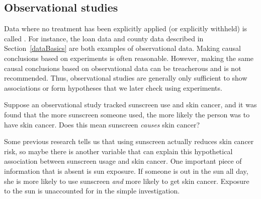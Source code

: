

\D{\newpage}

\subsection{Observational studies}

Data where no treatment has been explicitly applied
(or explicitly withheld) is called .
For instance, the loan data and county data described in
Section~\ref{dataBasics}
are both examples of observational data.
Making causal conclusions based on experiments is often reasonable.
However, making the same causal conclusions based on observational
data can be treacherous and is not recommended.
Thus, observational studies are generally only sufficient
to show associations or form hypotheses that we later check
using experiments.

\begin{exercisewrap}
\begin{nexercise}\label{sunscreenLurkingExample}%
Suppose an observational study tracked sunscreen use and skin cancer, and it was found that the more sunscreen someone used, the more likely the person was to have skin cancer. Does this mean sunscreen \emph{causes} skin cancer?\footnotemark
\end{nexercise}
\end{exercisewrap}

Some previous research tells us that using sunscreen actually reduces skin cancer risk, so maybe there is another variable that can explain this hypothetical association between sunscreen usage and skin cancer. One important piece of information that is absent is sun exposure. If someone is out in the sun all day, she is more likely to use sunscreen \emph{and} more likely to get skin cancer. Exposure to the sun is unaccounted for in the simple investigation.
\begin{center}
\end{center}

